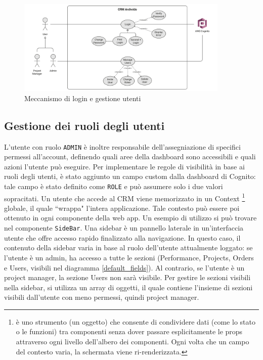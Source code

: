 \documentclass[target=bach,aauheader=,style=]{thud}
\begin{document}
\begin{figure}[H]
    \centering
    \includegraphics[width=0.9\textwidth]{img/diagrammi/use_case_login_e_manage.pdf} 
    \caption{Meccanismo di login e gestione utenti}
    \label{login_and_user_management}
\end{figure}

\subsection{Gestione dei ruoli degli utenti }
L'utente con ruolo \texttt{ADMIN} è inoltre responsabile dell'assegniazione di specifici permessi all'account, definendo quali aree della dashboard sono accessibili e quali azioni l'utente può eseguire. Per implementare le regole di visibilità in base ai ruoli degli utenti, è stato aggiunto un campo custom dalla dashboard di Cognito: tale campo è stato definito come \texttt{ROLE} e può assumere solo i due valori sopracitati. Un utente che accede al CRM viene memorizzato in un Context \footnote{è uno strumento (un oggetto) che consente di condividere dati (come lo stato o le funzioni) tra componenti senza dover passare esplicitamente le props attraverso ogni livello dell'albero dei componenti. Ogni volta che un campo del contesto varia, la schermata viene ri-renderizzata.} globale, il quale ``wrappa" l'intera applicazione. Tale contesto può essere poi ottenuto in ogni componente della web app. Un esempio di utilizzo si può trovare nel componente \texttt{SideBar}. Una sidebar è un pannello laterale in un'interfaccia utente che offre accesso rapido finalizzato alla navigazione. In questo caso, il contenuto della sidebar varia in base al ruolo dell'utente attualmente loggato: se l'utente è un admin, ha accesso a tutte le sezioni (Performance, Projects, Orders e Users, visibili nel diagramma \ref{default_fields}). Al contrario, se l'utente è un project manager, la sezione Users non sarà visibile. Per gestire le sezioni visibili nella sidebar, si utilizza un array di oggetti, il quale contiene l'insieme di sezioni visibili dall'utente con meno permessi, quindi project manager. 
\end{document}
